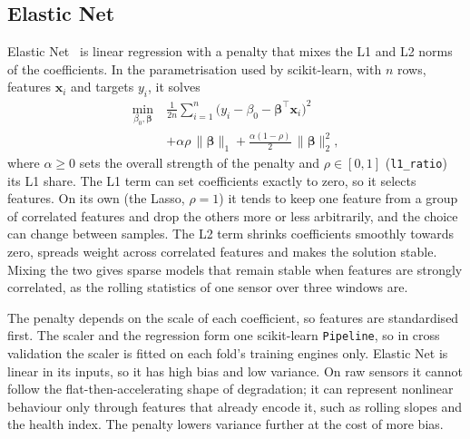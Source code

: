 \subsection{Elastic Net}
Elastic Net~\cite{zou2005elasticnet} is linear regression with a penalty
that mixes the L1 and L2 norms of the coefficients. In the parametrisation
used by scikit-learn, with $n$ rows, features $\mathbf{x}_i$ and targets
$y_i$, it solves
\begin{equation}
\begin{aligned}
\min_{\beta_0, \boldsymbol\beta}\ &
\frac{1}{2n}\sum_{i=1}^{n}\bigl(y_i - \beta_0 - \boldsymbol\beta^\top
\mathbf{x}_i\bigr)^2 \\
& + \alpha\rho\,\lVert\boldsymbol\beta\rVert_1
+ \frac{\alpha(1-\rho)}{2}\,\lVert\boldsymbol\beta\rVert_2^2 ,
\end{aligned}
\end{equation}
where $\alpha \ge 0$ sets the overall strength of the penalty and
$\rho \in [0, 1]$ (\texttt{l1\_ratio}) its L1 share. The L1 term can set
coefficients exactly to zero, so it selects features. On its own (the
Lasso, $\rho = 1$) it tends to keep one feature from a group of correlated
features and drop the others more or less arbitrarily, and the choice can
change between samples. The L2 term shrinks coefficients smoothly towards
zero, spreads weight across correlated features and makes the solution
stable. Mixing the two gives sparse models that remain stable when
features are strongly correlated, as the rolling statistics of one sensor
over three windows are.

The penalty depends on the scale of each coefficient, so features are
standardised first. The scaler and the regression form one scikit-learn
\texttt{Pipeline}, so in cross validation the scaler is fitted on each
fold's training engines only. Elastic Net is linear in its inputs, so it
has high bias and low variance. On raw sensors it cannot follow the
flat-then-accelerating shape of degradation; it can represent nonlinear
behaviour only through features that already encode it, such as rolling
slopes and the health index. The penalty lowers variance further at the
cost of more bias.

